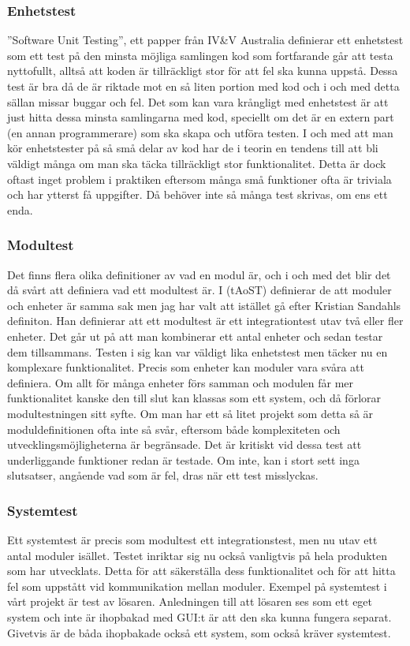 \subsubsection{Enhetstest}
	''Software Unit Testing'', ett papper från IV\&V Australia definierar ett enhetstest som ett test på den minsta möjliga samlingen kod som fortfarande går att testa nyttofullt, alltså att koden är tillräckligt stor för att fel ska kunna uppstå. Dessa test är bra då de är riktade mot en så liten portion med kod och i och med detta sällan missar buggar och fel. Det som kan vara krångligt med enhetstest är att just hitta dessa minsta samlingarna med kod, speciellt om det är en extern part (en annan programmerare) som ska skapa och utföra testen. I och med att man kör enhetstester på så små delar av kod har de i teorin en tendens till att bli väldigt många om man ska täcka tillräckligt stor funktionalitet. Detta är dock oftast inget problem i praktiken eftersom många små funktioner ofta är triviala och har ytterst få uppgifter. Då behöver inte så många test skrivas, om ens ett enda.
\subsubsection{Modultest}	
	Det finns flera olika definitioner av vad en modul är, och i och med det blir det då svårt att definiera vad ett modultest är. I (tAoST) definierar de att moduler och enheter är samma sak men jag har valt att istället gå efter Kristian Sandahls definiton. Han definierar att ett modultest är ett integrationtest utav två eller fler enheter. Det går ut på att man kombinerar ett antal enheter och sedan testar dem tillsammans. Testen i sig kan var väldigt lika enhetstest men täcker nu en komplexare funktionalitet. Precis som enheter kan moduler vara svåra att definiera. Om allt för många enheter förs samman och modulen får mer funktionalitet kanske den till slut kan klassas som ett system, och då förlorar modultestningen sitt syfte. Om man har ett så litet projekt som detta så är moduldefinitionen ofta inte så svår, eftersom både komplexiteten och utvecklingsmöjligheterna är begränsade. Det är kritiskt vid dessa test att underliggande funktioner redan är testade. Om inte, kan i stort sett inga slutsatser, angående vad som är fel, dras när ett test misslyckas.
\subsubsection{Systemtest}	
	Ett systemtest är precis som modultest ett integrationstest, men nu utav ett antal moduler isället. Testet inriktar sig nu också vanligtvis på hela produkten som har utvecklats. Detta för att säkerställa dess funktionalitet och för att hitta fel som uppstått vid kommunikation mellan moduler. Exempel på systemtest i vårt projekt är test av lösaren. Anledningen till att lösaren ses som ett eget system och inte är ihopbakad med GUI:t är att den ska kunna fungera separat. Givetvis är de båda ihopbakade också ett system, som också kräver systemtest.	
